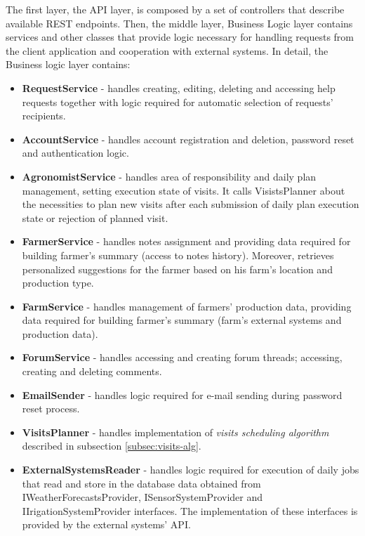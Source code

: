 The first layer, the API layer, is composed by a set of controllers that describe available REST endpoints. Then, the middle layer, Business Logic layer contains services and other classes that provide logic necessary for handling requests  from the client application and cooperation with external systems. In detail, the Business logic layer contains:
\begin{itemize}
    \item \textbf{RequestService} - handles creating, editing, deleting and accessing help requests together with logic required for automatic selection of requests' recipients.
    \item \textbf{AccountService} - handles account registration and deletion, password reset and authentication logic.
    \item \textbf{AgronomistService} - handles area of responsibility and daily plan management, setting execution state of visits. It calls VisistsPlanner about the necessities to plan new visits after each submission of daily plan execution state or rejection of planned visit.
    \item \textbf{FarmerService} - handles notes assignment and providing data required for building farmer's summary (access to notes history). Moreover, retrieves personalized suggestions for the farmer based on his farm's location and production type.
    \item \textbf{FarmService} - handles management of farmers' production data, providing data required for building farmer's summary (farm's external systems and  production data).  
    \item \textbf{ForumService} - handles accessing and creating forum threads; accessing, creating and deleting comments.
    \item \textbf{EmailSender} - handles logic required for e-mail sending during password reset process.
    \item \textbf{VisitsPlanner} - handles implementation of \textit{visits scheduling algorithm} described in subsection \ref{subsec:visits-alg}.
    \item \textbf{ExternalSystemsReader} - handles logic required for execution of daily jobs that read and store in the database data obtained from IWeatherForecastsProvider, ISensorSystemProvider and IIrigationSystemProvider interfaces. The implementation of these interfaces is provided by the external systems' API. 
\end{itemize}

